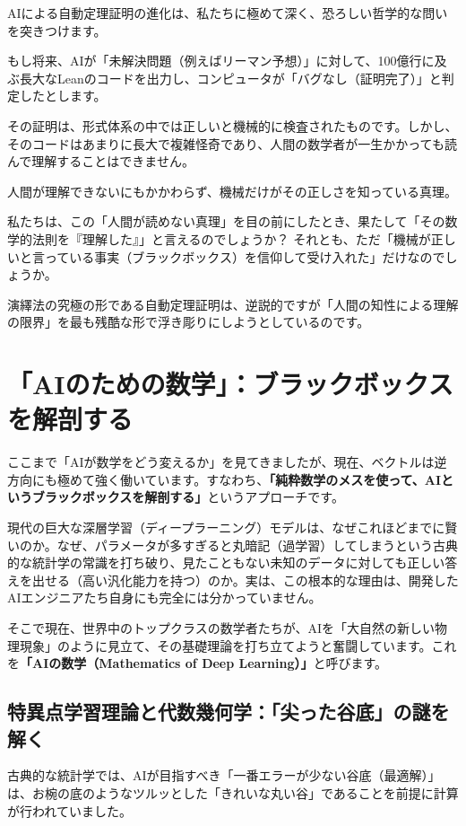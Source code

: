 AIによる自動定理証明の進化は、私たちに極めて深く、恐ろしい哲学的な問いを突きつけます。

もし将来、AIが「未解決問題（例えばリーマン予想）」に対して、100億行に及ぶ長大なLeanのコードを出力し、コンピュータが「バグなし（証明完了）」と判定したとします。

その証明は、形式体系の中では正しいと機械的に検査されたものです。しかし、そのコードはあまりに長大で複雑怪奇であり、人間の数学者が一生かかっても読んで理解することはできません。

人間が理解できないにもかかわらず、機械だけがその正しさを知っている真理。

私たちは、この「人間が読めない真理」を目の前にしたとき、果たして「その数学的法則を『理解した』」と言えるのでしょうか？ それとも、ただ「機械が正しいと言っている事実（ブラックボックス）を信仰して受け入れた」だけなのでしょうか。

演繹法の究極の形である自動定理証明は、逆説的ですが「人間の知性による理解の限界」を最も残酷な形で浮き彫りにしようとしているのです。

\section{「AIのための数学」：ブラックボックスを解剖する}

ここまで「AIが数学をどう変えるか」を見てきましたが、現在、ベクトルは逆方向にも極めて強く働いています。すなわち、\textbf{「純粋数学のメスを使って、AIというブラックボックスを解剖する」}というアプローチです。

現代の巨大な深層学習（ディープラーニング）モデルは、なぜこれほどまでに賢いのか。なぜ、パラメータが多すぎると丸暗記（過学習）してしまうという古典的な統計学の常識を打ち破り、見たこともない未知のデータに対しても正しい答えを出せる（高い汎化能力を持つ）のか。実は、この根本的な理由は、開発したAIエンジニアたち自身にも完全には分かっていません。

そこで現在、世界中のトップクラスの数学者たちが、AIを「大自然の新しい物理現象」のように見立て、その基礎理論を打ち立てようと奮闘しています。これを\textbf{「AIの数学（Mathematics of Deep Learning）」}と呼びます。

\subsection{特異点学習理論と代数幾何学：「尖った谷底」の謎を解く}

古典的な統計学では、AIが目指すべき「一番エラーが少ない谷底（最適解）」は、お椀の底のようなツルッとした「きれいな丸い谷」であることを前提に計算が行われていました。

